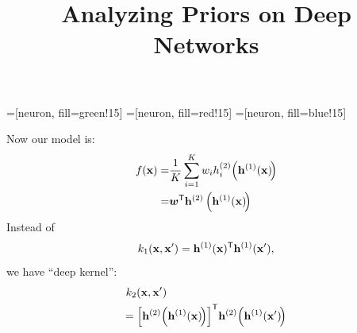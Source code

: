 \newcommand{\numhiddenper}[0]{2}
\newcommand{\indfeat}{h}


\newcommand{\numhiddentwo}[0]{5}


\def\halfshift{0.67cm}

=[neuron, fill=green!15]
=[neuron, fill=red!15]
=[neuron, fill=blue!15]

\newcommand{\neuronfunc}[2]{
\FPeval{\result}{clip(#1+#2)}
\texttt{[image: figures/two-d-draws/sqexp-draw-\\result]}
}




\newsavebox\deepkernels
\begin{lrbox}{\deepkernels}
  \begin{minipage}{0.4\textwidth}
Now our model is:
    \begin{align*}
f({\bf{x}}) = & \frac{1}{K} \sum_{i=1}^K w_i h_i^{(2)} \! \left( {\bf{h}}^{(1)}({\bf{x}}) \! \right) \\
= & \bm{w}^\mathsf{T} {\bf{h}}^{(2)} \left( {\bf{h}}^{(1)}({\bf{x}}) \! \right)
    \end{align*} 
	Instead of 
	$$k_1({\bf{x}}, {\bf{x}}') = {\bf{h}}^{(1)}({\bf{x}}) ^\mathsf{T} {\bf{h}}^{(1)}({\bf{x}}'),$$
	we have ``deep kernel'':
	\begin{align*}
	& k_2({\bf{x}}, {\bf{x}}') \\ 
	 & \!\! = \left[ {\bf{h}}^{(2)} \! \left( {\bf{h}}^{(1)}({\bf{x}}) \! \right) \right] ^\mathsf{T} \! {\bf{h}}^{(2)} \! \left( {\bf{h}}^{(1)}({\bf{x}}') \! \right)
	\end{align*}
  \end{minipage}
\end{lrbox}








\title{Analyzing Priors on Deep Networks}


